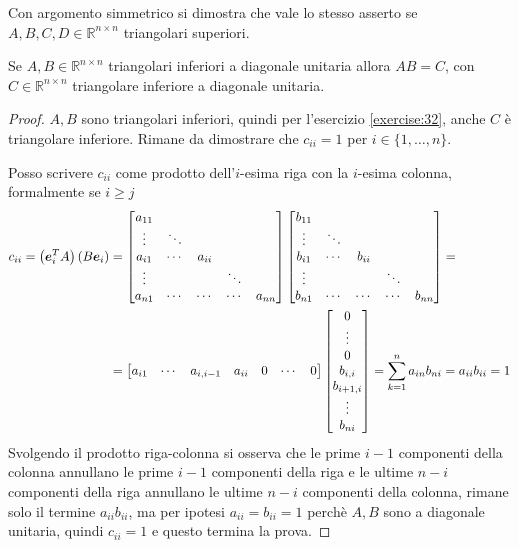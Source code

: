 Con argomento simmetrico si dimostra che vale lo stesso asserto se $A,B,C,D \in
\mathbb{R}^{n \times n}$ triangolari superiori.

\begin{exercise}[3.3]
Se $A,B \in \mathbb{R}^{n \times n}$ triangolari inferiori a diagonale unitaria
allora $AB=C$, con $C \in \mathbb{R}^{n \times n}$ triangolare inferiore a
diagonale unitaria.
\end{exercise}
\begin{proof}
$A,B$ sono triangolari inferiori, quindi per l'esercizio \ref{exercise:32},
anche $C$ \`e triangolare inferiore. Rimane da dimostrare che $c_{ii} = 1$ per
$i \in \lbrace 1, \ldots, n\rbrace$.

Posso scrivere $c_{ii}$ come prodotto dell'$i$-esima riga con la $i$-esima
colonna, formalmente se $i \geq j$
\begin{displaymath}
\begin{split}
c_{ii} = \left ( \vect{e}_{i}^{T}A \right ) \left ( B \vect{e}_{i} \right) & =
\begin{bmatrix}
a_{11} \\
\vdots & \ddots \\
a_{i1} & \cdots & a_{ii} \\
\vdots & 		&		& \ddots\\
a_{n1} & \cdots & \cdots &\cdots & a_{nn}
\end{bmatrix} %
\begin{bmatrix}
b_{11} \\
\vdots & \ddots \\
b_{i1} & \cdots & b_{ii} \\
\vdots & 		&		& \ddots\\
b_{n1} & \cdots & \cdots &\cdots & b_{nn}
\end{bmatrix} = \\ %
&= \begin{bmatrix}
a_{i1} & \cdots & a_{i,i-1} & a_{ii} & 0 & \cdots & 0
\end{bmatrix}
\begin{bmatrix}
0 \\
\vdots \\
0 \\
b_{i,i} \\
b_{i+1,i} \\
\vdots \\
b_{ni}
\end{bmatrix} = \sum_{k = 1}^{n}{a_{in}b_{ni}} = a_{ii}b_{ii} = 1
\end{split}
\end{displaymath}
Svolgendo il prodotto riga-colonna si osserva che le prime $i-1$ componenti
della colonna annullano le prime $i-1$ componenti della riga e le ultime $n-i$
componenti della riga annullano le ultime $n-i$ componenti della colonna, rimane
solo il termine $a_{ii}b_{ii}$, ma per ipotesi $a_{ii}=b_{ii}=1$ perch\`e $A, B$
sono a diagonale unitaria, quindi $c_{ii} = 1$ e questo termina la prova.
\end{proof}

